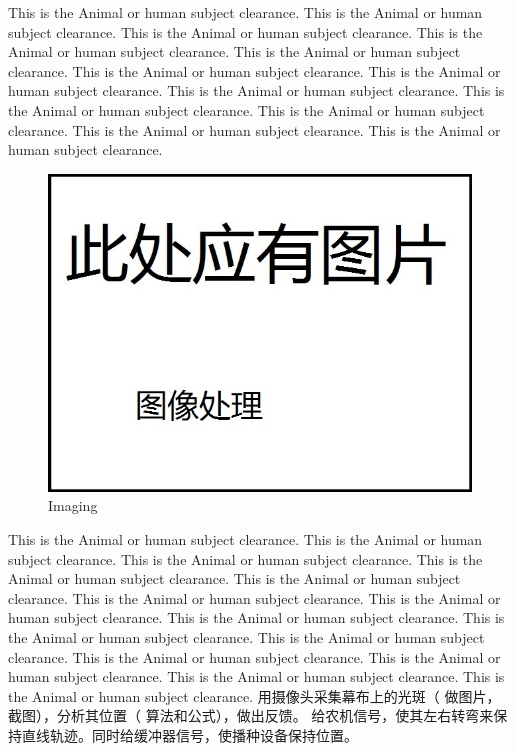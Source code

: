 \documentclass[12pt]{article}
\begin{document}
\begin{flushleft}
This is the Animal or human subject clearance. This is the Animal or human subject clearance. This is the Animal or human subject clearance. This is the Animal or human subject clearance. This is the Animal or human subject clearance. This is the Animal or human subject clearance. This is the Animal or human subject clearance. This is the Animal or human subject clearance. This is the Animal or human subject clearance. This is the Animal or human subject clearance. This is the Animal or human subject clearance. This is the Animal or human subject clearance. 
\begin{figure}[ht!]
	\begin{center}
		\includegraphics[scale = 0.6]{imaging.jpg}
		\caption{Imaging}
	\end{center}
\end{figure}
This is the Animal or human subject clearance. This is the Animal or human subject clearance. This is the Animal or human subject clearance. This is the Animal or human subject clearance. This is the Animal or human subject clearance. This is the Animal or human subject clearance. This is the Animal or human subject clearance. This is the Animal or human subject clearance. This is the Animal or human subject clearance. This is the Animal or human subject clearance. This is the Animal or human subject clearance. This is the Animal or human subject clearance. This is the Animal or human subject clearance. This is the Animal or human subject clearance. 
用摄像头采集幕布上的光斑（ 做图片，截图），分析其位置（ 算法和公式），做出反馈。 给农机信号，使其左右转弯来保持直线轨迹。同时给缓冲器信号，使播种设备保持位置。


\end{flushleft}
\end{document}

